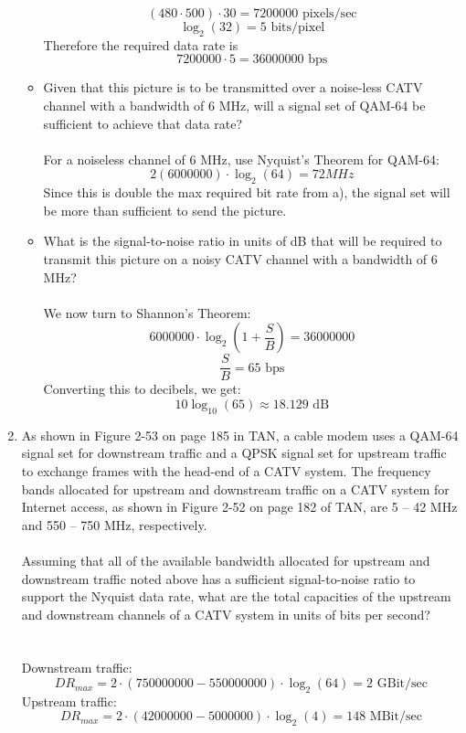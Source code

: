 \documentclass[12pt]{article}
\begin{document}
\begin{enumerate}
\begin{itemize}
    \[ (480 \cdot 500) \cdot 30 = 7200000 \textrm{ pixels/sec} \]
    \[ \log_2(32) = 5 \textrm{ bits/pixel} \]
    Therefore the required data rate is 
    \[ 7200000 \cdot 5 = 36000000 \textrm{ bps} \]
  \item Given that this picture is to be transmitted over a noise-less CATV channel with a bandwidth of 6 MHz, will a signal set of QAM-64 be sufficient to achieve that data rate? \\ \\
    For a noiseless channel of 6 MHz, use Nyquist's Theorem for QAM-64: 
    \[ 2(6000000) \cdot \log_2(64) = 72 MHz \]
    Since this is double the max required bit rate from a), the signal set will be more than sufficient to send the picture.
  \item What is the signal-to-noise ratio in units of dB that will be required to transmit this picture on a noisy CATV channel with a bandwidth of 6 MHz? \\ \\
    We now turn to Shannon's Theorem:
    \[ 6000000 \cdot \log_2(1+\frac{S}{B}) = 36000000 \]
    \[ \frac{S}{B} = 65 \textrm{ bps} \]
    Converting this to decibels, we get:
    \[ 10\log_{10}(65) \approx 18.129 \textrm{ dB} \]
  \end{itemize}

\newpage

\item As shown in Figure 2-53 on page 185 in TAN, a cable modem uses a QAM-64 signal set for downstream traffic and a QPSK signal set for upstream traffic to exchange frames with the head-end of a CATV system.  The frequency bands allocated for upstream and downstream traffic on a CATV system for Internet access, as shown in Figure 2-52 on page 182 of TAN, are 5 – 42 MHz and 550 – 750 MHz, respectively. \\ \\
Assuming that all of the available bandwidth allocated for upstream and downstream traffic noted above has a sufficient signal-to-noise ratio to support the Nyquist data rate, what are the total capacities of the upstream and downstream channels of a CATV system in units of bits per second? \\ \\ \\

Downstream traffic:
\[DR_{max} = 2 \cdot (750000000 - 550000000) \cdot \log_2(64) = 2 \textrm{ GBit/sec} \]
Upstream traffic:
\[ DR_{max} = 2 \cdot (42000000 - 5000000) \cdot \log_2(4) = 148 \textrm{ MBit/sec} \]


\end{enumerate}
\end{document}
